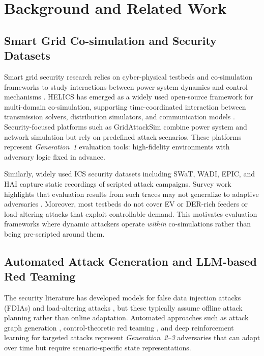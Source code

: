 \section{Background and Related Work}
\label{sec:background}

\subsection{Smart Grid Co-simulation and Security Datasets}

Smart grid security research relies on cyber-physical testbeds and co-simulation frameworks to study interactions between power system dynamics and control mechanisms \cite{cintuglu2017testbeds,yohanandhan2022review}. HELICS has emerged as a widely used open-source framework for multi-domain co-simulation, supporting time-coordinated interaction between transmission solvers, distribution simulators, and communication models \cite{hardy2024helics}. Security-focused platforms such as GridAttackSim \cite{le2020gridattacksim} combine power system and network simulation but rely on predefined attack scenarios. These platforms represent \emph{Generation~1} evaluation tools: high-fidelity environments with adversary logic fixed in advance.

Similarly, widely used ICS security datasets including SWaT, WADI, EPIC, and HAI \cite{swatdataset,wadidataset,epicdataset,haidataset} capture static recordings of scripted attack campaigns. Survey work highlights that evaluation results from such traces may not generalize to adaptive adversaries \cite{sahani2023smartgridids}. Moreover, most testbeds do not cover EV or DER-rich feeders or load-altering attacks that exploit controllable demand. This motivates evaluation frameworks where dynamic attackers operate \emph{within} co-simulations rather than being pre-scripted around them.

\subsection{Automated Attack Generation and LLM-based Red Teaming}

The security literature has developed models for false data injection attacks (FDIAs) \cite{aoufi2020fdiasurvey} and load-altering attacks \cite{laaSurvey2024}, but these typically assume offline attack planning rather than online adaptation. Automated approaches such as attack graph generation \cite{a2g2v}, control-theoretic red teaming \cite{tackett2024redteam}, and deep reinforcement learning for targeted attacks \cite{targetedAttackSynthesis} represent \emph{Generation~2--3} adversaries that can adapt over time but require scenario-specific state representations.


